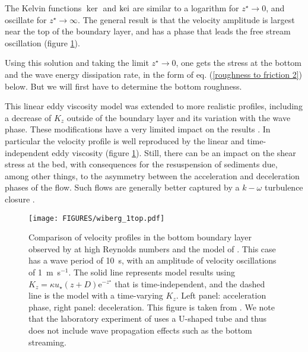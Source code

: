 The Kelvin functions $\ker$ and ${\rm kei}$ are similar to a 
logarithm for $z^\star\rightarrow 0$, and oscillate for  $z^\star \rightarrow  \infty$. The general result is that the 
velocity amplitude is largest near the top of the boundary layer, and has a phase that leads the free stream oscillation  (figure \ref{fig_Wiberg_top}). 

Using this solution and taking the limit  $z^\star\rightarrow 0$, one gets the stress at the bottom and the wave energy dissipation rate, in the form of eq.  (\ref{roughness to friction 2}) below.
But we will first have to determine the bottom roughness.

This linear eddy viscosity model was extended to more realistic profiles, including a decrease of $K_z$ outside of the boundary layer and its variation with the wave phase. These modifications
have a very limited impact on the results \citep{Trowbridge&Madsen1984a,Jensen&al.1989,Wiberg1995,Davies&Villaret1999,Marin2004}. In particular the velocity profile is well reproduced by the 
linear and time-independent eddy viscosity (figure \ref{fig_Wiberg_top}). Still, there can be an impact on the shear stress at the bed, with consequences for the resuspension of sediments due, among other things, 
to the asymmetry between the acceleration and deceleration phases of the flow. Such flows are generally better captured by a $k-\omega$ turbulence closure \citep[e.g.][]{Marieu&al.2008}.
\begin{figure}
\centerline{\texttt{[image: FIGURES/wiberg\_1top.pdf]}}
  \caption{Comparison of velocity profiles in the bottom boundary layer observed by \cite{Jensen&al.1989} at high Reynolds numbers and the model of \cite{Wiberg1995}.
  This case has a wave period of 10~s, with an amplitude of velocity oscillations of  1~m~s$^{-1}$. 
  The solid line represents model results using  $K_z=\kappa u_\star (z+D) {\mathrm e}^{-z^\star}$ that is time-independent, and the dashed line is the model 
  with a time-varying  $K_z$. Left panel: acceleration phase, right panel: deceleration. This figure is taken from \cite{Wiberg1995}. We note that the laboratory experiment of \cite{Jensen&al.1989} uses a
  U-shaped tube and thus does not include wave propagation effects such as the bottom streaming.} \label{fig_Wiberg_top}
\end{figure}



